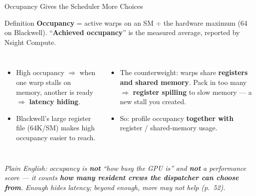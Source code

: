 \documentclass[aspectratio=169]{beamer}
\newcommand{\kw}[1]{\textbf{\textcolor{kwblue}{#1}}}
\newcommand{\pe}[1]{\par{\setlength{\fboxsep}{2.5pt}\noindent\colorbox{navy!9}{\parbox{\dimexpr\textwidth-5pt\relax}{\footnotesize\itshape Plain English: #1}}}}
\begin{document}
\begin{frame}{Occupancy Gives the Scheduler More Choices}
  \begin{block}{Definition}
    \kw{Occupancy} = active warps on an SM $\div$ the hardware maximum (64 on Blackwell).
    ``\kw{Achieved occupancy}'' is the measured average, reported by Nsight Compute.
  \end{block}
  \begin{columns}[t]
    \begin{itemize}
      \item High occupancy $\Rightarrow$ when one warp stalls on memory, another is ready
            $\Rightarrow$ \kw{latency hiding}.
      \item Blackwell's large register file (64K/SM) makes high occupancy easier to reach.
    \end{itemize}
    \begin{itemize}
      \item The counterweight: warps share \kw{registers and shared memory}. Pack in too many
            $\Rightarrow$ \kw{register spilling} to slow memory --- a new stall you created.
      \item So: profile occupancy \kw{together with} register / shared-memory usage.
    \end{itemize}
  \end{columns}
  \pe{occupancy is \kw{not} ``how busy the GPU is'' and \kw{not} a performance score --- it counts \kw{how many resident crews the dispatcher can choose from}. Enough hides latency; beyond enough, more may not help (p.~52).}
\end{frame}
\end{document}
